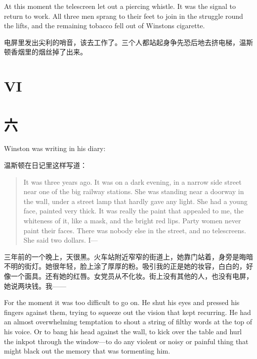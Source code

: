 \begin{paracol}{2}
\switchcolumn*

At this moment the telescreen let out a piercing whistle. It was the
signal to return to work. All three men sprang to their feet to join in
the struggle round the lifts, and the remaining tobacco fell out of
Winston\textquotesingle s cigarette.

\switchcolumn

电屏里发出尖利的哨音，该去工作了。三个人都站起身争先恐后地去挤电梯，温斯顿香烟里的烟丝掉了出来。

\switchcolumn*


\section{VI}\label{vi}

\switchcolumn

\section*{六}\label{ux516d}

\switchcolumn*

Winston was writing in his diary:

\switchcolumn

温斯顿在日记里这样写道：

\switchcolumn*

\begin{quotation}
It was three years ago. It was on a dark evening, in a narrow side
street near one of the big railway stations. She was standing near a
doorway in the wall, under a street lamp that hardly gave any light. She
had a young face, painted very thick. It was really the paint that
appealed to me, the whiteness of it, like a mask, and the bright red
lips. Party women never paint their faces. There was nobody else in the
street, and no telescreens. She said two dollars. I---
\end{quotation}

\switchcolumn

三年前的一个晚上，天很黑。火车站附近窄窄的街道上，她靠门站着，身旁是晦暗不明的街灯。她很年轻，脸上涂了厚厚的粉。吸引我的正是她的妆容，白白的，好像一个面具。还有她的红唇。女党员从不化妆。街上没有其他的人，也没有电屏，她说两块钱。我——

\switchcolumn*

For the moment it was too difficult to go on. He shut his eyes and
pressed his fingers against them, trying to squeeze out the vision that
kept recurring. He had an almost overwhelming temptation to shout a
string of filthy words at the top of his voice. Or to bang his head
against the wall, to kick over the table and hurl the inkpot through the
window---to do any violent or noisy or painful thing that might black
out the memory that was tormenting him.


\end{paracol}
